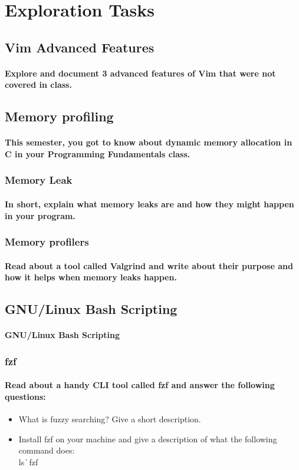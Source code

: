 \documentclass{article}
\begin{document}
\section{Exploration Tasks}
\subsection{Vim Advanced Features}
\paragraph{Explore and document 3 advanced features of Vim that were not covered in class.}
\subsection{Memory profiling}
\paragraph{This semester, you got to know about dynamic memory allocation in C in your Programming
Fundamentals class.}
\subsubsection{Memory Leak}
\paragraph{In short, explain what memory leaks are and how they might happen in your program.}
\subsubsection{Memory profilers}
\paragraph{Read about a tool called Valgrind and write about their purpose and how it helps when
memory leaks happen.}
\subsection{GNU/Linux Bash Scripting}
\paragraph{GNU/Linux Bash Scripting}
\subsubsection{fzf}
\paragraph{Read about a handy CLI tool called fzf and answer the following questions:}
\begin{itemize}
    \item  What is fuzzy searching? Give a short description.
    \item Install fzf on your machine and give a description of what the following command
does:\\
ls {\|} fzf


\end{itemize}
\end{document}
